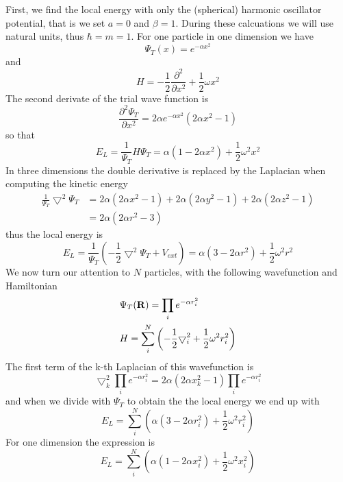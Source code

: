 \documentclass[english, a4paper]{article}
\begin{document}
\noindent First, we find the local energy with only the (spherical) harmonic oscillator potential, that is we set $a=0$ and $\beta=1$.
During these calcuations we will use natural units, thus $\hbar=m=1$.
For one particle in one dimension we have
\begin{equation}
\Psi_T(x) = e^{-\alpha x^2}
\end{equation}
and
\begin{equation}
    H =  
	 -\frac{1}{2}
	 \frac{\partial^2}{\partial x^2} +
	 \frac{1}{2}\omega x^2
\end{equation}
The second derivate of the trial wave function is
\begin{equation}
 \frac{\partial^2 \Psi_T}{\partial x^2} = 2\alpha e^{-\alpha x^2}(2\alpha x^2 - 1)
\end{equation}
so that
\begin{equation}
 E_L = \frac{1}{\Psi_T}H\Psi_T = \alpha(1 - 2\alpha x^2) + \frac{1}{2}\omega^2x^2
\end{equation}
In three dimensions the double derivative is replaced by the Laplacian when computing the kinetic energy
\begin{align}
 \frac{1}{\Psi_T}\bigtriangledown^2\Psi_T &= 2\alpha(2\alpha x^2 - 1) + 2\alpha(2\alpha y^2 - 1) + 2\alpha(2\alpha z^2 - 1) \\
                          &= 2\alpha(2\alpha r^2 - 3) \label{analytickinnoninteracing}
\end{align}
thus the local energy is
\begin{equation}
 E_L = \frac{1}{\Psi_T}\left(-\frac{1}{2}\bigtriangledown^2\Psi_T + V_{ext}\right) = \alpha(3 - 2\alpha r^2) + 
 \frac{1}{2}\omega^2r^2 
\end{equation}
We now turn our attention to $N$ particles, with the following wavefunction and Hamiltonian
\begin{align}
 &\Psi_T({\bf R}) = \prod_i e^{-\alpha r_i^2} \\
 &H =     \sum_i^N \left(
	 -\frac{1}{2}
	 { \bigtriangledown }_{i}^2 +
	 \frac{1}{2}\omega^2r_i^2 \right)
\end{align}
The first term of the k-th Laplacian of this wavefunction is
\begin{equation}
 \bigtriangledown^2_k\prod_i e^{-\alpha r_i^2} = 2\alpha(2\alpha x_k^2 - 1)\prod_i e^{-\alpha r_i^2}
\end{equation}
and when we divide with $\Psi_T$ to obtain the the local energy we end up with
\begin{equation}
 E_L = \sum_i^N \left( \alpha(3 - 2\alpha r_i^2) + \frac{1}{2}\omega^2r_i^2 \right)
\end{equation}
For one dimension the expression is
\begin{equation}
 E_L = \sum_i^N \left( \alpha(1 - 2\alpha x_i^2) + \frac{1}{2}\omega^2x_i^2 \right)
\end{equation}
\\
\end{document}
